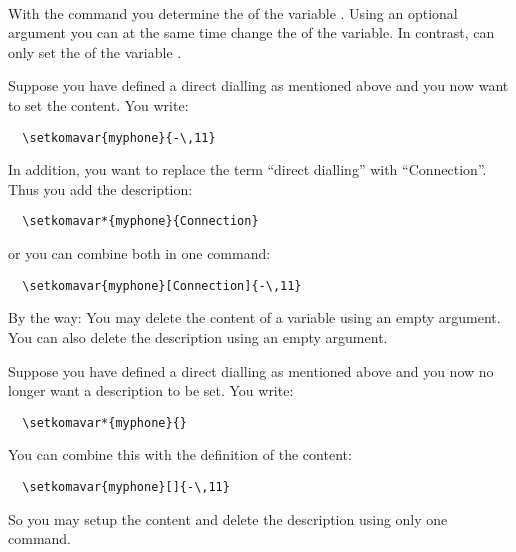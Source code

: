 \begin{Declaration}
    \\
\end{Declaration}
%
%
With the command  you determine the
 of the variable . Using an optional
argument you can at the same time  change  the 
of the variable. In contrast,  can only set the
 of the variable .
\begin{Example}
  Suppose you have defined a direct dialling as mentioned above
  and you now want to set the content. You write:
\begin{lstlisting}
  \setkomavar{myphone}{-\,11}
\end{lstlisting}
  In addition, you want to replace the term ``direct dialling''
  with ``Connection''. Thus you add the description:
\begin{lstlisting}
  \setkomavar*{myphone}{Connection}
\end{lstlisting}
  or you can combine both in one command:
\begin{lstlisting}
  \setkomavar{myphone}[Connection]{-\,11}
\end{lstlisting}
\end{Example}
By the way: You may delete the content of a variable using an empty
 argument. You can also delete the description using an
empty  argument.
\begin{Example}
  Suppose you have defined a direct dialling as mentioned above and
  you now no longer want a description to be set. You write:
\begin{lstlisting}
  \setkomavar*{myphone}{}
\end{lstlisting}
  You can combine this with the definition of the content:
\begin{lstlisting}
  \setkomavar{myphone}[]{-\,11}
\end{lstlisting}
  So you may setup the content and delete the description using only
  one command.
\end{Example}
%
%
%

